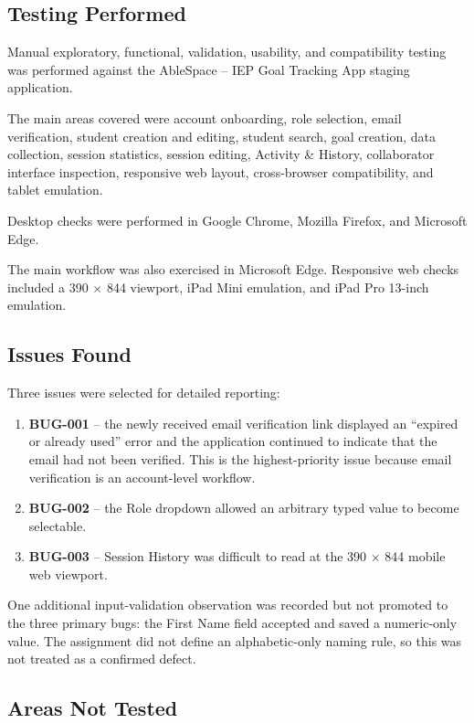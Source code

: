 \documentclass[11pt,a4paper]{article}
\begin{document}
\subsection{Testing Performed}

Manual exploratory, functional, validation, usability, and compatibility testing was performed against the AbleSpace -- IEP Goal Tracking App staging application.

The main areas covered were account onboarding, role selection, email verification, student creation and editing, student search, goal creation, data collection, session statistics, session editing, Activity \& History, collaborator interface inspection, responsive web layout, cross-browser compatibility, and tablet emulation.

Desktop checks were performed in Google Chrome, Mozilla Firefox, and Microsoft Edge.

The main workflow was also exercised in Microsoft Edge. Responsive web checks included a 390 $\times$ 844 viewport, iPad Mini emulation, and iPad Pro 13-inch emulation.

\subsection{Issues Found}

Three issues were selected for detailed reporting:

\begin{enumerate}
    \item \textbf{BUG-001} -- the newly received email verification link displayed an ``expired or already used'' error and the application continued to indicate that the email had not been verified. This is the highest-priority issue because email verification is an account-level workflow.
    \item \textbf{BUG-002} -- the Role dropdown allowed an arbitrary typed value to become selectable.
    \item \textbf{BUG-003} -- Session History was difficult to read at the 390 $\times$ 844 mobile web viewport.
\end{enumerate}

One additional input-validation observation was recorded but not promoted to the three primary bugs: the First Name field accepted and saved a numeric-only value. The assignment did not define an alphabetic-only naming rule, so this was not treated as a confirmed defect.

\subsection{Areas Not Tested}
\end{document}
